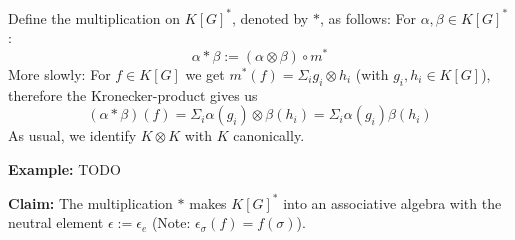 \message{ !name(roughdraft.tex)}\documentclass{article}
\theoremstyle{prrt}
\begin{document}
Define the multiplication on $ K \left\lbrack G \right\rbrack^\ast $, denoted by $\ast$, as follows:  For $\alpha, \beta \in K \left\lbrack G \right\rbrack^\ast$:  
\begin{equation}
  \alpha \ast \beta := \left( \alpha \otimes \beta \right) \circ m^\ast
\end{equation}
More slowly: For $f \in K \left\lbrack G \right\rbrack$ we get $m^\ast \left( f \right) = \Sigma_i g_i \otimes h_i$ (with $g_i , h_i \in K \left\lbrack G \right\rbrack$), therefore the Kronecker-product gives us
\begin{equation}
  \left( \alpha \ast \beta \right) \left( f \right) = \Sigma_i \alpha \left( g_i \right) \otimes \beta \left( h_i \right) = \Sigma_i \alpha \left( g_i \right) \beta \left( h_i \right)
\end{equation}
As usual, we identify $K \otimes K$ with $K$ canonically.  
%
%

\textbf{Example:} TODO

\smallskip
\textbf{Claim:} The multiplication $\ast$ makes $K \left\lbrack G \right\rbrack^\ast$ into an associative algebra with the neutral element $ \epsilon := \epsilon_e$ (Note: $\epsilon_\sigma \left( f \right) = f \left( \sigma \right)$).
\end{document}
